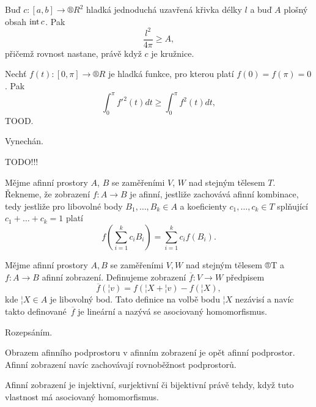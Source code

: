 \documentclass[12pt]{article}					%
\begin{document}
\begin{veta}
	Buď $c: [a, b] \rightarrow ®R^2$ hladká jednoduchá uzavřená křivka délky $l$ a buď $A$ plošný obsah $\operatorname{int} c$. Pak
	$$ \frac{l^2}{4\pi} ≥ A, $$
	přičemž rovnost nastane, právě když $c$ je kružnice.
\end{veta}

\begin{lemma}[Wirtinger]
	Nechť $f(t): [0, \pi] \rightarrow ®R$ je hladká funkce, pro kterou platí $f(0) = f(\pi) = 0$. Pak
	$$ \int_0^\pi f'^2(t)dt ≥ \int_0^\pi f^2(t)dt, $$
	TOOD.

	\begin{dukazin}
		Vynechán.
	\end{dukazin}
\end{lemma}


TODO!!!


\begin{definice}
	Mějme afinní prostory $A$, $B$ se zaměřeními $V$, $W$ nad stejným tělesem $T$. Řekneme, že zobrazení $f: A \rightarrow B$ je afinní, jestliže zachovává afinní kombinace, tedy jestliže pro libovolné body $B_1, …, B_k \in A$ a koeficienty $c_1, …, c_k \in T$ splňující $c_1 + … + c_k = 1$ platí
	$$ f(\sum_{i=1}^k c_iB_i) = \sum_{i=1}^k c_i f(B_i). $$
\end{definice}

\begin{definice}
	Mějme afinní prostory $A, B$ se zaměřeními $V, W$ nad stejným tělesem ®T a $f: A \rightarrow B$ afinní zobrazení. Definujeme zobrazení $\overline{f}: V \rightarrow W$ předpisem
	$$ \overline{f}(¦v) = f(¦X + ¦v) - f(¦X), $$
	kde $¦X \in A$ je libovolný bod. Tato definice na volbě bodu $¦X$ nezávisí a navíc takto definované $\overline{f}$ je lineární a nazývá se asociovaný homomorfismus.

	\begin{dukazin}
		Rozepsáním.
	\end{dukazin}
\end{definice}

\begin{dusledek}
	Obrazem afinního podprostoru v afinním zobrazení je opět afinní podprostor. Afinní zobrazení navíc zachovávají rovnoběžnost podprostorů.
\end{dusledek}

\begin{dusledek}
	Afinní zobrazení je injektivní, surjektivní či bijektivní právě tehdy, když tuto vlastnost má asociovaný homomorfismus.
\end{dusledek}
\end{document}
